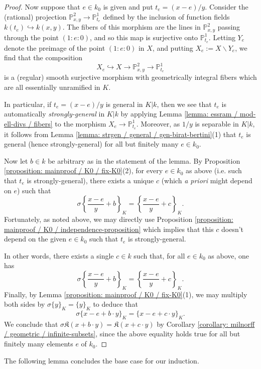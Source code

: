 \documentclass[11pt]{amsart}
\theoremstyle{definition}
\theoremstyle{remark}
\numberwithin{equation}{section}
\newcommand{\Pbb}{\mathbb{P}}
\newcommand{\Kfrak}{\mathfrak{K}}
\begin{document}
\begin{proof}
  Now suppose that $e \in k_0$ is given and put $t_e = (x-e)/y$.
  Consider the (rational) projection $\Pbb^2_{x,y} \rightarrow \Pbb^1_{t_e}$ defined by the inclusion of function fields $k(t_e) \hookrightarrow k(x,y)$.
  The fibers of this morphism are the lines in $\Pbb^2_{x,y}$ passing through the point $(1:e:0)$, and so this map is surjective onto $\Pbb^1_{t_e}$.
  Letting $Y_e$ denote the preimage of the point $(1:e:0)$ in $X$, and putting $X_e := X \smallsetminus Y_e$, we find that the composition 
  \[ X_e \hookrightarrow X \rightarrow \Pbb^2_{x,y} \rightarrow \Pbb^1_{t_e} \]
  is a (regular) smooth surjective morphism with geometrically integral fibers which are all essentially unramified in $K$.

  In particular, if $t_e = (x-e)/y$ is general in $K|k$, then we see that $t_e$ is automatically \emph{strongly-general} in $K|k$ by applying Lemma \ref{lemma: essram / mod-ell-divs / fibers} to the morphism $X_e \rightarrow \Pbb^1_{t_e}$.
  Moreover, as $1/y$ is separable in $K|k$, it follows from Lemma \ref{lemma: strgen / general / gen-birat-bertini}(1) that $t_e$ is general (hence strongly-general) for all but finitely many $e \in k_0$.

  Now let $b \in k$ be arbitrary as in the statement of the lemma.
  By Proposition \ref{proposition: mainproof / K0 / fix-K0}(2), for every $e \in k_0$ as above (i.e. such that $t_e$ is strongly-general), there exists a unique $c$ (which \emph{a priori} might depend on $e$) such that
  \[ \sigma\left\{ \frac{x-e}{y} + b \right\}_K = \left\{\frac{x-e}{y} + c\right\}_K. \]
  Fortunately, as noted above, we may directly use Proposition \ref{proposition: mainproof / K0 / independence-proposition} which implies that this $c$ doesn't depend on the given $e \in k_0$ such that $t_e$ is strongly-general.

  In other words, there exists a single $c \in k$ such that, for all $e \in k_0$ as above, one has
  \[ \sigma\left\{ \frac{x-e}{y} + b \right\}_K = \left\{\frac{x-e}{y} + c\right\}_K. \]
  Finally, by Lemma \ref{proposition: mainproof / K0 / fix-K0}(1), we may multiply both sides by $\sigma\{y\}_K = \{y\}_K$ to deduce that
  \[ \sigma\{x-e+b \cdot y\}_K = \{x-e + c \cdot y\}_K. \]
  We conclude that $\sigma\Kfrak(x+b \cdot y) = \Kfrak(x+ c \cdot y)$ by Corollary \ref{corollary: milnorff / geometric / infinite-subsets}, since the above equality holds true for all but finitely many elements $e$ of $k_0$.
\end{proof}

The following lemma concludes the base case for our induction.
\end{document}
